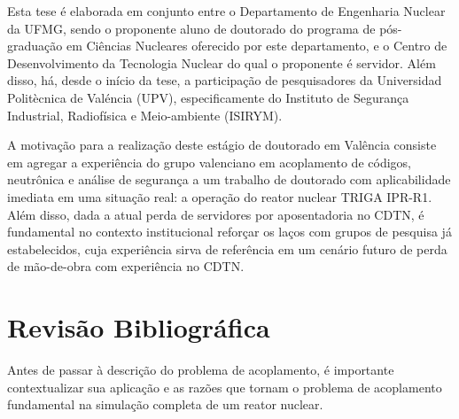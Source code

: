 \documentclass[12pt,openright,twoside,a4paper,english,french,spanish,brazil]{abntex2}
\begin{document}
Esta tese é elaborada em conjunto entre o Departamento de Engenharia Nuclear da 
UFMG, sendo o proponente aluno de doutorado do programa de pós-graduação em Ciências 
Nucleares oferecido por este departamento, e o Centro de Desenvolvimento da Tecnologia 
Nuclear do qual o proponente é servidor. Além disso, há, desde o início da tese, a 
participação de pesquisadores da Universidad Politècnica de Valéncia (UPV), especificamente 
do Instituto de Segurança Industrial, Radiofísica e Meio-ambiente (ISIRYM).

A motivação para a realização deste estágio de doutorado em Valência consiste em 
agregar a experiência do grupo valenciano em acoplamento de códigos, neutrônica e análise 
de segurança a um trabalho de doutorado com aplicabilidade imediata em uma situação real: a operação 
do reator nuclear TRIGA IPR-R1. Além disso, dada a atual perda de servidores por aposentadoria no CDTN, 
é fundamental no contexto institucional reforçar os laços com grupos de pesquisa já estabelecidos, 
cuja experiência sirva de referência em um cenário futuro de perda de mão-de-obra com experiência no CDTN.




\chapter*[Revisão Bibliográfica]{Revisão Bibliográfica}
\label{chap:rev}



Antes de passar à descrição do problema de acoplamento, é importante contextualizar sua 
aplicação e as razões que tornam o problema de acoplamento fundamental na simulação completa 
de um reator nuclear. 
\end{document}
